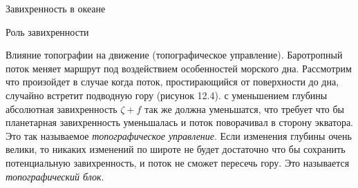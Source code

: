 \begin{chapter}{Завихренность в океане}
\begin{section}{Роль завихренности}
\begin{paragraph}{Влияние топографии на движение (топографическое управление).} 
Баротропный поток меняет маршрут под воздействием особенностей
морского дна. Рассмотрим что произойдет в случае когда поток,
простирающийся от поверхности до дна, случайно встретит подводную гору
(рисунок 12.4). с уменьшением глубины абсолютная завихренность $\zeta + f$ так
же должна уменьшатся, что требует что бы планетарная завихренность
уменьшалась и поток поворачивал в сторону экватора. Это так называемое
\emph{топографическое управление}. Если изменения глубины очень велики, то
никаких изменений по широте не будет достаточно что бы сохранить
потенциальную завихренность, и поток не сможет пересечь гору. Это
называется \emph{топографический блок}.
%
\end{paragraph}


\end{section}
\end{chapter}
